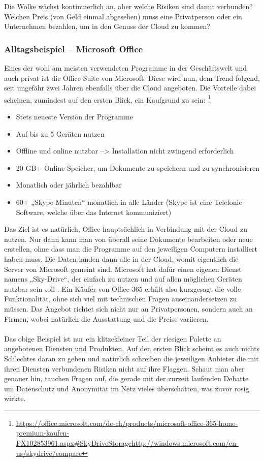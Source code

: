 Die Wolke wächst kontinuierlich an, aber welche Risiken sind damit verbunden? Welchen Preis (von Geld einmal abgesehen) muss eine Privatperson oder ein Unternehmen bezahlen, um in den Genuss der Cloud zu kommen?

\subsubsection{Alltagsbeispiel – Microsoft Office}
Eines der wohl am meisten verwendeten Programme in der Geschäftswelt und auch privat ist die Office Suite von Microsoft. Diese wird nun, dem Trend folgend, seit ungefähr zwei Jahren ebenfalls über die Cloud angeboten. Die Vorteile dabei scheinen, zumindest auf den ersten Blick, ein Kaufgrund zu sein: 
\footnote{\url{https://office.microsoft.com/de-ch/products/microsoft-office-365-home-premium-kaufen-FX102853961.aspx\#SkyDriveStoragehttp://windows.microsoft.com/en-us/skydrive/compare}}

\begin{itemize}
\item Stets neueste Version der Programme
\item Auf bis zu 5 Geräten nutzen
\item Offline und online nutzbar --> Installation nicht zwingend erforderlich
\item 20 GB+ Online-Speicher, um Dokumente zu speichern und zu synchronisieren
\item Monatlich oder jährlich bezahlbar
\item 60+ „Skype-Minuten“ monatlich in alle Länder (Skype ist eine Telefonie-Software, welche über das Internet kommuniziert)
\end{itemize}

Das Ziel ist es natürlich, Office hauptsächlich in Verbindung mit der Cloud zu nutzen. Nur dann kann man von überall seine Dokumente bearbeiten oder neue erstellen, ohne dass man die Programme auf den jeweiligen Computern installiert haben muss. Die Daten landen dann alle in der Cloud, womit eigentlich die Server von Microsoft gemeint sind. Microsoft hat dafür einen eigenen Dienst namens „Sky-Drive“, der einfach zu nutzen und auf allen möglichen Geräten nutzbar sein soll . Ein Käufer von Office 365 erhält also kurzgesagt die volle Funktionalität, ohne sich viel mit technischen Fragen auseinandersetzen zu müssen.
Das Angebot richtet sich nicht nur an Privatpersonen, sondern auch an Firmen, wobei natürlich die Ausstattung und die Preise variieren.
\\
\\
Das obige Beispiel ist nur ein klitzekleiner Teil der riesigen Palette an angebotenen Diensten und Produkten. Auf den ersten Blick scheint es auch nichts Schlechtes daran zu geben und natürlich schreiben die jeweiligen Anbieter die mit ihren Diensten verbundenen Risiken nicht auf ihre Flaggen. Schaut man aber genauer hin, tauchen Fragen auf, die gerade mit der zurzeit laufenden Debatte um Datenschutz und Anonymität im Netz vieles überschatten, was zuvor rosig wirkte.

